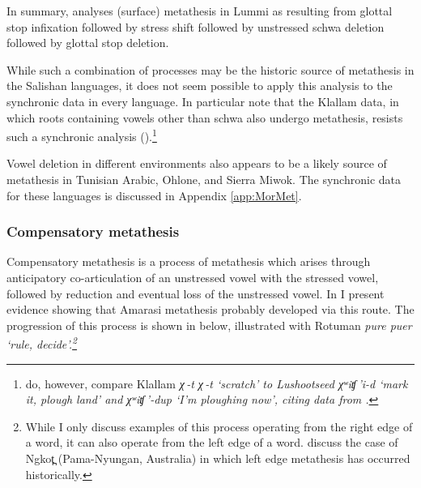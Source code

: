 In summary, \cite{de74} analyses (surface) metathesis in Lummi
as resulting from glottal stop infixation followed by stress shift
followed by unstressed schwa deletion followed by glottal stop deletion.

While such a combination of processes may be the
historic source of metathesis in the Salishan languages,
it does not seem possible to apply this analysis to the synchronic data in every language.
In particular \citet[540]{blga98} note that the Klallam data,
in which roots containing vowels other than schwa also undergo metathesis,
resists such a synchronic analysis ().\footnote{
		\citet[540]{blga98} do, however, compare Klallam
		\it{χ\,-t} {\ra}\it{χ\,-t} `scratch'
		to Lushootseed \it{χʷiʧ\,'i-d} `mark it, plough land' and  \it{χʷiʧ\,'-dup} `I'm ploughing now',
		citing data from \cite{bahehi94}.}
		
Vowel deletion in different environments also appears
to be a likely source of metathesis in Tunisian Arabic, Ohlone, and Sierra Miwok.
The synchronic data for these languages is discussed in Appendix \ref{app:MorMet}.

\subsubsection{Compensatory metathesis}\label{sec:ComMet}
Compensatory metathesis is a process %
of metathesis which arises through anticipatory co-articulation
of an unstressed vowel with the stressed vowel, followed by reduction
and eventual loss of the unstressed vowel.
In  I present evidence showing that Amarasi
metathesis probably developed via this route.
The progression of this process is shown in  below,
illustrated with Rotuman \it{pure} {\ra} \it{puer} `rule, decide'.\footnote{
		While I only discuss examples of this process operating from the right edge of a word,
		it can also operate from the left edge of a word.
		\citet[537]{blga98} discuss the case of Ngkot̪ (Pama-Nyungan, Australia)
		in which left edge metathesis has occurred historically.}

\begin{exe}\let\eachwordone=\textnormal
	\label{ex:ComMet}
\end{exe}

